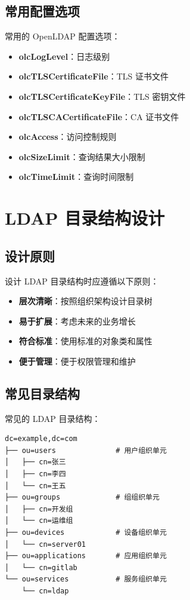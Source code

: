 \documentclass[12pt,UTF8]{ctexbook}
\begin{document}
\section{常用配置选项}
\label{sec:common_options}

常用的 OpenLDAP 配置选项：

\begin{itemize}
    \item \textbf{olcLogLevel}：日志级别
    \item \textbf{olcTLSCertificateFile}：TLS 证书文件
    \item \textbf{olcTLSCertificateKeyFile}：TLS 密钥文件
    \item \textbf{olcTLSCACertificateFile}：CA 证书文件
    \item \textbf{olcAccess}：访问控制规则
    \item \textbf{olcSizeLimit}：查询结果大小限制
    \item \textbf{olcTimeLimit}：查询时间限制
\end{itemize}

\chapter{LDAP 目录结构设计}
\label{chap:ldap_structure}

\section{设计原则}
\label{sec:design_principles}

设计 LDAP 目录结构时应遵循以下原则：

\begin{itemize}
    \item \textbf{层次清晰}：按照组织架构设计目录树
    \item \textbf{易于扩展}：考虑未来的业务增长
    \item \textbf{符合标准}：使用标准的对象类和属性
    \item \textbf{便于管理}：便于权限管理和维护
\end{itemize}

\section{常见目录结构}
\label{sec:common_structures}

常见的 LDAP 目录结构：

\begin{verbatim}
dc=example,dc=com
├── ou=users              # 用户组织单元
│   ├── cn=张三
│   ├── cn=李四
│   └── cn=王五
├── ou=groups             # 组组织单元
│   ├── cn=开发组
│   └── cn=运维组
├── ou=devices            # 设备组织单元
│   └── cn=server01
├── ou=applications       # 应用组织单元
│   └── cn=gitlab
└── ou=services           # 服务组织单元
    └── cn=ldap
\end{verbatim}
\end{document}
